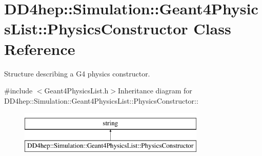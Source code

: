 \hypertarget{class_d_d4hep_1_1_simulation_1_1_geant4_physics_list_1_1_physics_constructor}{
\section{DD4hep::Simulation::Geant4PhysicsList::PhysicsConstructor Class Reference}
\label{class_d_d4hep_1_1_simulation_1_1_geant4_physics_list_1_1_physics_constructor}
}


Structure describing a G4 physics constructor.  


{\ttfamily \#include $<$Geant4PhysicsList.h$>$}Inheritance diagram for DD4hep::Simulation::Geant4PhysicsList::PhysicsConstructor::\begin{figure}[H]
\begin{center}
\leavevmode
\includegraphics[height=2cm]{class_d_d4hep_1_1_simulation_1_1_geant4_physics_list_1_1_physics_constructor}
\end{center}
\end{figure}

